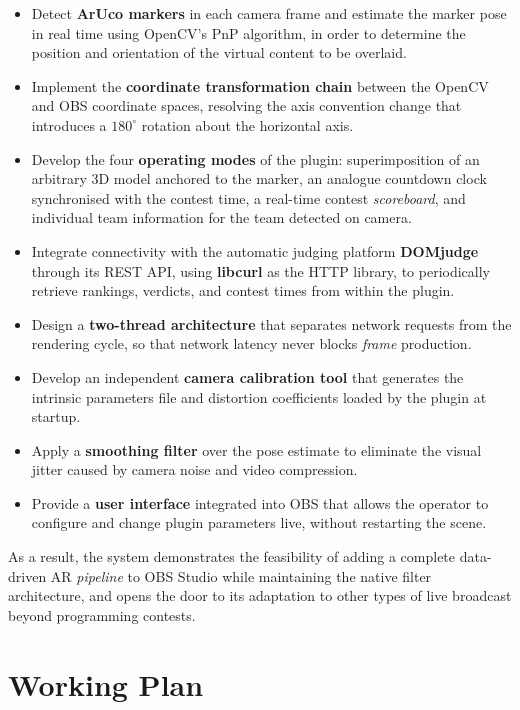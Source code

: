 \begin{itemize}
  \item Detect \textbf{ArUco markers} in each camera frame and estimate the marker pose in real time using OpenCV's PnP algorithm, in order to determine the position and orientation of the virtual content to be overlaid.
  \item Implement the \textbf{coordinate transformation chain} between the OpenCV and OBS coordinate spaces, resolving the axis convention change that introduces a $180^\circ$ rotation about the horizontal axis.
  \item Develop the four \textbf{operating modes} of the plugin: superimposition of an arbitrary 3D model anchored to the marker, an analogue countdown clock synchronised with the contest time, a real-time contest \textit{scoreboard}, and individual team information for the team detected on camera.
  \item Integrate connectivity with the automatic judging platform \textbf{DOMjudge} through its REST API, using \textbf{libcurl} as the HTTP library, to periodically retrieve rankings, verdicts, and contest times from within the plugin.
  \item Design a \textbf{two-thread architecture} that separates network requests from the rendering cycle, so that network latency never blocks \textit{frame} production.
  \item Develop an independent \textbf{camera calibration tool} that generates the intrinsic parameters file and distortion coefficients loaded by the plugin at startup.
  \item Apply a \textbf{smoothing filter} over the pose estimate to eliminate the visual jitter caused by camera noise and video compression.
  \item Provide a \textbf{user interface} integrated into OBS that allows the operator to configure and change plugin parameters live, without restarting the scene.
\end{itemize}

As a result, the system demonstrates the feasibility of adding a complete data-driven AR \textit{pipeline} to OBS Studio while maintaining the native filter architecture, and opens the door to its adaptation to other types of live broadcast beyond programming contests.


\section{Working Plan}
\label{sec:plan_trabajo_en}

